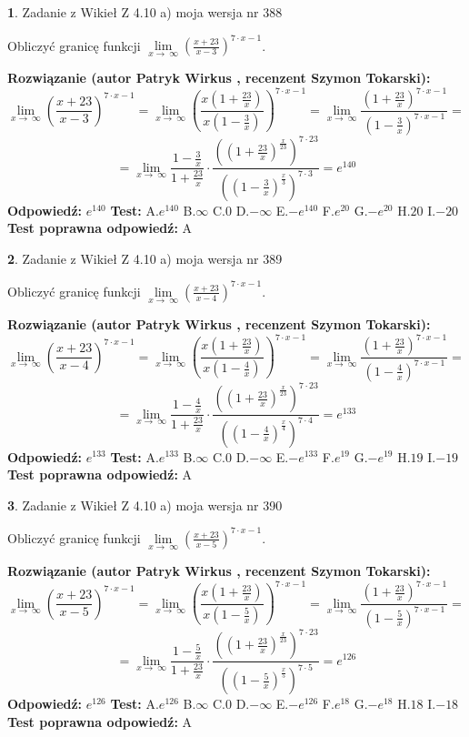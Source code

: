 \documentclass[12pt, a4paper]{article}
\theoremstyle{definition} %
\newtheorem{zad}{}
\newcommand{\zadStart}[1]{\begin{zad}#1\newline}
\newcommand{\zadStop}{\end{zad}}
\newcommand{\rozwStart}[2]{\noindent \textbf{Rozwiązanie (autor #1 , recenzent #2): }\newline}
\newcommand{\rozwStop}{\newline}
\newcommand{\odpStart}{\noindent \textbf{Odpowiedź:}\newline}
\newcommand{\odpStop}{\newline}
\newcommand{\testStart}{\noindent \textbf{Test:}\newline}
\newcommand{\testStop}{\newline}
\newcommand{\kluczStart}{\noindent \textbf{Test poprawna odpowiedź:}\newline}
\newcommand{\kluczStop}{\newline}
\begin{document}
\zadStart{Zadanie z Wikieł Z 4.10 a) moja wersja nr 388}

Obliczyć granicę funkcji  $\lim\limits_{x\to\ \infty}(\frac{x+23}{x-3})^{7\cdot x-1}$.
\zadStop
\rozwStart{Patryk Wirkus}{Szymon Tokarski}
$$\lim\limits_{x\to\ \infty}(\frac{x+23}{x-3})^{7\cdot x-1} = \lim\limits_{x\to\ \infty}(\frac{x(1+\frac{23}{x})}{x(1-\frac{3}{x})})^{7\cdot x-1}=\lim\limits_{x\to\ \infty}\frac{(1+\frac{23}{x})^{7\cdot x-1}}{(1-\frac{3}{x})^{7\cdot x-1}}=$$
$$=\lim\limits_{x\to\ \infty}\frac{1-\frac{3}{x}}{1+\frac{23}{x}}\cdot\frac{((1+\frac{23}{x})^{\frac{x}{23}})^{7\cdot23}}{((1-\frac{3}{x})^{\frac{x}{3}})^{7\cdot3}}=e^{140}$$
\rozwStop
\odpStart
$e^{140}$
\odpStop
\testStart
A.$e^{140}$ B.$\infty$ C.$0$ D.$-\infty$ E.$-e^{140}$
F.$e^{20}$ G.$-e^{20}$
H.$20$
I.$-20$
\testStop
\kluczStart
A
\kluczStop



\zadStart{Zadanie z Wikieł Z 4.10 a) moja wersja nr 389}

Obliczyć granicę funkcji  $\lim\limits_{x\to\ \infty}(\frac{x+23}{x-4})^{7\cdot x-1}$.
\zadStop
\rozwStart{Patryk Wirkus}{Szymon Tokarski}
$$\lim\limits_{x\to\ \infty}(\frac{x+23}{x-4})^{7\cdot x-1} = \lim\limits_{x\to\ \infty}(\frac{x(1+\frac{23}{x})}{x(1-\frac{4}{x})})^{7\cdot x-1}=\lim\limits_{x\to\ \infty}\frac{(1+\frac{23}{x})^{7\cdot x-1}}{(1-\frac{4}{x})^{7\cdot x-1}}=$$
$$=\lim\limits_{x\to\ \infty}\frac{1-\frac{4}{x}}{1+\frac{23}{x}}\cdot\frac{((1+\frac{23}{x})^{\frac{x}{23}})^{7\cdot23}}{((1-\frac{4}{x})^{\frac{x}{4}})^{7\cdot4}}=e^{133}$$
\rozwStop
\odpStart
$e^{133}$
\odpStop
\testStart
A.$e^{133}$ B.$\infty$ C.$0$ D.$-\infty$ E.$-e^{133}$
F.$e^{19}$ G.$-e^{19}$
H.$19$
I.$-19$
\testStop
\kluczStart
A
\kluczStop



\zadStart{Zadanie z Wikieł Z 4.10 a) moja wersja nr 390}

Obliczyć granicę funkcji  $\lim\limits_{x\to\ \infty}(\frac{x+23}{x-5})^{7\cdot x-1}$.
\zadStop
\rozwStart{Patryk Wirkus}{Szymon Tokarski}
$$\lim\limits_{x\to\ \infty}(\frac{x+23}{x-5})^{7\cdot x-1} = \lim\limits_{x\to\ \infty}(\frac{x(1+\frac{23}{x})}{x(1-\frac{5}{x})})^{7\cdot x-1}=\lim\limits_{x\to\ \infty}\frac{(1+\frac{23}{x})^{7\cdot x-1}}{(1-\frac{5}{x})^{7\cdot x-1}}=$$
$$=\lim\limits_{x\to\ \infty}\frac{1-\frac{5}{x}}{1+\frac{23}{x}}\cdot\frac{((1+\frac{23}{x})^{\frac{x}{23}})^{7\cdot23}}{((1-\frac{5}{x})^{\frac{x}{5}})^{7\cdot5}}=e^{126}$$
\rozwStop
\odpStart
$e^{126}$
\odpStop
\testStart
A.$e^{126}$ B.$\infty$ C.$0$ D.$-\infty$ E.$-e^{126}$
F.$e^{18}$ G.$-e^{18}$
H.$18$
I.$-18$
\testStop
\kluczStart
A
\kluczStop
\end{document}
